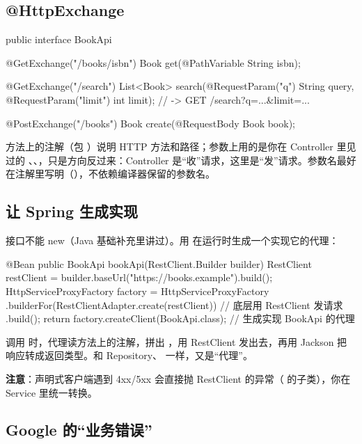\subsection{@HttpExchange}

\begin{java}
public interface BookApi {

    @GetExchange("/books/{isbn}")
    Book get(@PathVariable String isbn);

    @GetExchange("/search")
    List<Book> search(@RequestParam("q") String query, @RequestParam("limit") int limit);
    // -> GET /search?q=...&limit=...

    @PostExchange("/books")
    Book create(@RequestBody Book book);
}
\end{java}

方法上的注解（包 ）说明 HTTP 方法和路径；参数上用的是你在 Controller 里见过的 、、，只是方向反过来：Controller 是“收”请求，这里是“发”请求。参数名最好在注解里写明（），不依赖编译器保留的参数名。

\subsection{让 Spring 生成实现}

接口不能 new（Java 基础补充里讲过）。用  在运行时生成一个实现它的代理：

\begin{java}
@Bean
public BookApi bookApi(RestClient.Builder builder) {
    RestClient restClient = builder.baseUrl("https://books.example").build();
    HttpServiceProxyFactory factory = HttpServiceProxyFactory
            .builderFor(RestClientAdapter.create(restClient))      // 底层用 RestClient 发请求
            .build();
    return factory.createClient(BookApi.class);                     // 生成实现 BookApi 的代理
}
\end{java}

调用  时，代理读方法上的注解，拼出 ，用 RestClient 发出去，再用 Jackson 把响应转成返回类型。和 Repository、 一样，又是“代理”。

\textbf{注意}：声明式客户端遇到 4xx/5xx 会直接抛 RestClient 的异常（ 的子类），你在 Service 里统一转换。

\subsection{Google 的“业务错误”}

